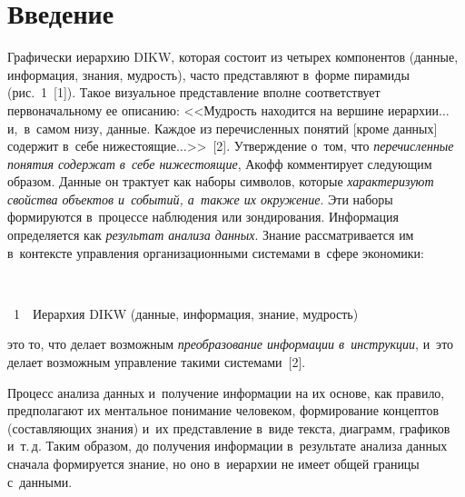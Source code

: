 \thispagestyle{headings}

\begin{multicols}{2}

\label{st\stat}

\section{Введение}

\vspace*{-3pt}

  Графически иерархию DIKW, которая со\-сто\-ит из четырех компонентов 
(данные, информация, знания, муд\-рость), час\-то пред\-став\-ля\-ют в~форме 
пирамиды (рис.~1~[1]). Такое визуальное пред\-став\-ле\-ние впол\-не соответствует 
первоначальному ее описанию: <<Муд\-рость находится на вершине иерархии$\ldots$ 
и,~в~самом низу, данные. Каж\-дое из пе\-ре\-чис\-лен\-ных понятий [кроме данных] 
содержит в~себе нижестоящие$\ldots$>>~[2]. Утверж\-де\-ние о~том, что 
\textit{пе\-ре\-чис\-лен\-ные понятия содержат в~себе ни\-же\-сто\-ящие}, Акофф 
комментирует сле\-ду\-ющим образом. Данные он трактует как наборы 
символов, которые \textit{характеризуют свойства объектов и~событий, 
а~также их окружение}. Эти наборы формируются в~процессе наблюдения 
или зондирования. Информация определяется как \textit{результат анализа 
данных}. Знание рас\-смат\-ри\-ва\-ет\-ся им в~кон\-текс\-те 
управ\-ле\-ния организационными сис\-те\-ма\-ми в~сфере экономики:\linebreak\vspace*{-12pt}

{ \begin{center}  %
    \mbox{%
\epsfxsize=79.014mm 
}

\end{center}

\vspace*{-3pt}

\noindent
{{\figurename~1}\ \ \small{Иерархия DIKW (данные, информация, знание, муд\-рость)
}}}

\vspace*{9pt}

\noindent

 это то, что делает 
воз\-мож\-ным \textit{преобразование информации в~инструкции}, и~это делает 
воз\-мож\-ным управ\-ле\-ние такими сис\-те\-ма\-ми~[2].



  Процесс анализа данных и~получение информации на их основе, как правило, 
предполагают их ментальное понимание человеком, формирование концептов 
(со\-став\-ля\-ющих знания) и~их пред\-став\-ле\-ние в~виде текс\-та, диаграмм, графиков 
и~т.\,д. Таким образом, до получения информации в~результате анализа данных 
сначала формируется знание, но оно в~иерархии не имеет общей границы 
с~дан\-ными.
  

\end{multicols}
